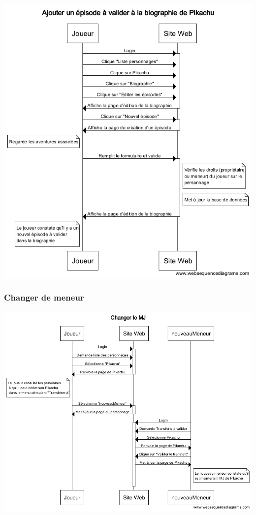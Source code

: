 \documentclass[a4paper, 11pt, titlepage]{article}
\begin{document}
\begin{center}
\includegraphics[scale=0.7]{sequence/AjouterEpisodeBiographie.png}
\end{center}

\subsubsection{Changer de meneur}

\begin{center}
\includegraphics[scale=0.55]{sequence/ChangerleMJ.png}
\end{center}
\end{document}
